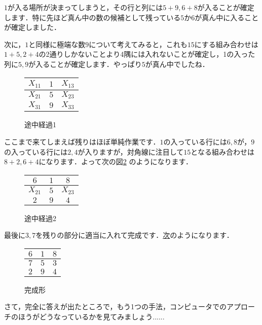 \documentclass[11pt]{jsarticle}
\begin{document}
$1$が入る場所が決まってしまうと，その行と列には$5+9, 6+8$が入ることが確定します．特に先ほど真ん中の数の候補として残っている$5$か$6$が真ん中に入ることが確定しました．

次に，$1$と同様に極端な数$9$について考えてみると，これも$15$にする組み合わせは$1+5, 2+4$の2通りしかないことより4隅には入れないことが確定し，1の入った列に$5, 9$が入ることが確定します．やっぱり$5$が真ん中でしたね．

\begin{figure}[H]
  \centering
  \begin{tabular}{|c|c|c|}
    \hline
    $X_{11}$ & $1$ & $X_{13}$ \\ \hline
    $X_{21}$ & $5$ & $X_{23}$ \\ \hline
    $X_{31}$ & $9$ & $X_{33}$ \\ \hline
  \end{tabular}
  \caption{途中経過1}
  \label{}
\end{figure}

ここまで来てしまえば残りはほぼ単純作業です．$1$の入っている行には$6,8$が，$9$の入っている行には$2,4$が入りますが，対角線に注目して$15$となる組み合わせは$8+2, 6+4$になります．よって次の図\ref{totyu} のようになります．

\begin{figure}[H]
  \centering
  \begin{tabular}{|c|c|c|}
    \hline
    $6$ & $1$ & $8$ \\ \hline
    $X_{21}$ & $5$ & $X_{23}$ \\ \hline
    $2$ & $9$ & $4$ \\ \hline
  \end{tabular}
  \caption{途中経過2}
  \label{totyu}
\end{figure}

最後に$3,7$を残りの部分に適当に入れて完成です．\hyperlink{kansei}{次}のようになります．

\begin{figure}[H]
  \centering
  \begin{tabular}{|c|c|c|}
    \hline
    $6$ & $1$ & $8$ \\ \hline
    $7$ & $5$ & $3$ \\ \hline
    $2$ & $9$ & $4$ \\ \hline
  \end{tabular}
  \caption{完成形}
  \label{kansei}
  \hypertarget{kansei}{}
\end{figure}

さて，完全に答えが出たところで，もう1つの手法，コンピュータでのアプローチのほうがどうなっているかを見てみましょう......
\end{document}
